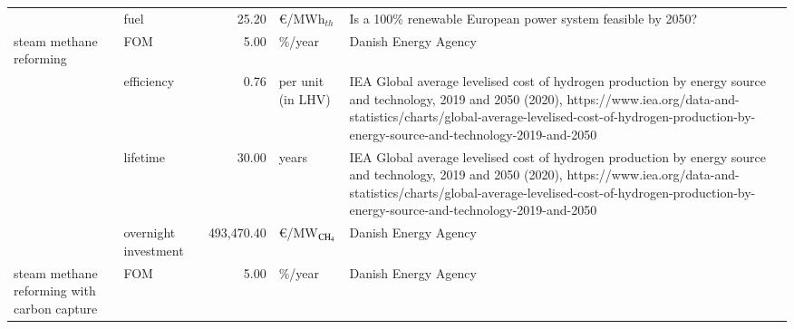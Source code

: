 \begin{longtable}{p{4cm}p{4cm}rp{3cm}p{10cm}}
                      & fuel &        25.20 &              \euro/MWh$_{th}$ &                                                                                                                                                                                                                                                                         Is a 100\% renewable European power system feasible by 2050? \\
steam methane reforming & FOM &         5.00 &                       \%/year &                                                                                                                                                                                                                                                                                                                 Danish Energy Agency \\
                      & efficiency &         0.76 &             per unit (in LHV) &                                                                    IEA Global average levelised cost of hydrogen production by energy source and technology, 2019 and 2050 (2020), https://www.iea.org/data-and-statistics/charts/global-average-levelised-cost-of-hydrogen-production-by-energy-source-and-technology-2019-and-2050 \\
                      & lifetime &        30.00 &                         years &                                                                    IEA Global average levelised cost of hydrogen production by energy source and technology, 2019 and 2050 (2020), https://www.iea.org/data-and-statistics/charts/global-average-levelised-cost-of-hydrogen-production-by-energy-source-and-technology-2019-and-2050 \\
                      & overnight investment &   493,470.40 &         \euro/MW$_{\ce{CH4}}$ &                                                                                                                                                                                                                                                                                                                 Danish Energy Agency \\
steam methane reforming with carbon capture & FOM &         5.00 &                       \%/year &                                                                                                                                                                                                                                                                                                                 Danish Energy Agency \\

\end{longtable}
